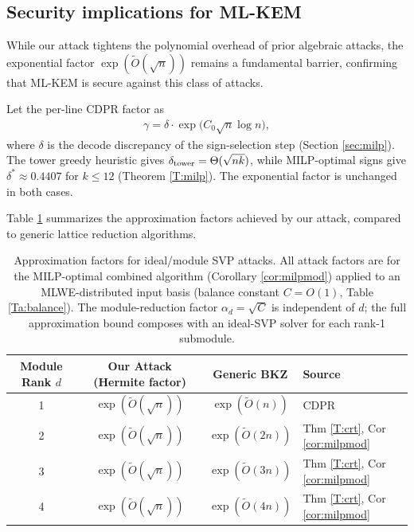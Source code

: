 \documentclass[11pt,a4paper]{article}
\theoremstyle{plain}
\theoremstyle{definition}
\theoremstyle{remark}
\newcommand{\tO}{\tilde{O}}
\begin{document}
\subsection{Security implications for ML-KEM}\label{subsec:security}

While our attack tightens the polynomial overhead of prior algebraic attacks, the exponential factor $\exp(\tO(\sqrt{n}))$ remains a fundamental barrier, confirming that ML-KEM is secure against this class of attacks.

Let the per-line CDPR factor as 
\begin{align}
  \gamma=\delta\cdot\exp\!\bigl(C_0\sqrt n\log n\bigr),
  \label{E:gammafac}
\end{align}
where $\delta$ is the decode discrepancy of the sign-selection step (Section \ref{sec:milp}). The tower greedy heuristic gives $\delta_{\rm tower}=\Theta(\sqrt{nk})$, while MILP-optimal signs give $\delta^*\approx 0.4407$ for $k\le 12$ (Theorem \ref{T:milp}). The exponential factor is unchanged in both cases.

Table \ref{Ta:security} summarizes the approximation factors achieved by our attack, compared to generic lattice reduction algorithms.
\begin{table}[t]
\centering
\caption{Approximation factors for ideal/module SVP attacks. All attack factors are for the MILP-optimal combined algorithm (Corollary \ref{cor:milpmod}) applied to an MLWE-distributed input basis (balance constant $C=O(1)$, Table \ref{Ta:balance}). The module-reduction factor $\alpha_d=\sqrt{C}$ is independent of $d$; the full approximation bound composes with an ideal-SVP solver for each rank-1 submodule.}
\label{Ta:security}
\begin{tabular}{@{}cccl@{}}
\toprule
Module Rank $d$ & Our Attack (Hermite factor) & Generic BKZ & Source \\
\midrule
1 & $\exp(\tO(\sqrt n))$              & $\exp(\tO(n))$  & CDPR \cite{CDPR16} \\
2 & $\exp(\tO(\sqrt n))$              & $\exp(\tO(2n))$ & Thm \ref{T:crt}, Cor \ref{cor:milpmod} \\
3 & $\exp(\tO(\sqrt n))$              & $\exp(\tO(3n))$ & Thm \ref{T:crt}, Cor \ref{cor:milpmod} \\
4 & $\exp(\tO(\sqrt n))$              & $\exp(\tO(4n))$ & Thm \ref{T:crt}, Cor \ref{cor:milpmod} \\
\bottomrule
\end{tabular}
\end{table}
\end{document}
